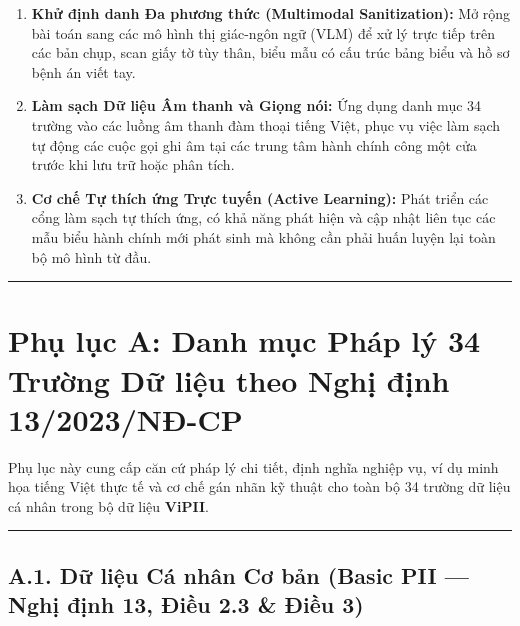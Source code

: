 \documentclass[
  11pt,
  a4paper,
]{article}
\providecommand{\tightlist}{%
  \setlength{\itemsep}{0pt}\setlength{\parskip}{0pt}}
\begin{document}
\begin{enumerate}
\def\labelenumi{\arabic{enumi}.}
\tightlist
\item
  \textbf{Khử định danh Đa phương thức (Multimodal Sanitization):} Mở rộng bài toán sang các mô hình
  thị giác-ngôn ngữ (VLM) để xử lý trực tiếp trên các bản chụp, scan giấy tờ tùy thân, biểu mẫu có
  cấu trúc bảng biểu và hồ sơ bệnh án viết tay.
\item
  \textbf{Làm sạch Dữ liệu Âm thanh và Giọng nói:} Ứng dụng danh mục 34 trường vào các luồng âm
  thanh đàm thoại tiếng Việt, phục vụ việc làm sạch tự động các cuộc gọi ghi âm tại các trung tâm
  hành chính công một cửa trước khi lưu trữ hoặc phân tích.
\item
  \textbf{Cơ chế Tự thích ứng Trực tuyến (Active Learning):} Phát triển các cổng làm sạch tự thích
  ứng, có khả năng phát hiện và cập nhật liên tục các mẫu biểu hành chính mới phát sinh mà không cần
  phải huấn luyện lại toàn bộ mô hình từ đầu.
\end{enumerate}

\begin{center}\rule{0.5\linewidth}{0.5pt}\end{center}

\section{Phụ lục A: Danh mục Pháp lý 34 Trường Dữ liệu theo Nghị định
13/2023/NĐ-CP}\label{phux1ee5-lux1ee5c-a-danh-mux1ee5c-phuxe1p-luxfd-34-trux1b0ux1eddng-dux1eef-liux1ec7u-theo-nghux1ecb-ux111ux1ecbnh-132023nux111-cp}

Phụ lục này cung cấp căn cứ pháp lý chi tiết, định nghĩa nghiệp vụ, ví dụ minh họa tiếng Việt thực
tế và cơ chế gán nhãn kỹ thuật cho toàn bộ 34 trường dữ liệu cá nhân trong bộ dữ liệu
\textbf{ViPII}.

\begin{center}\rule{0.5\linewidth}{0.5pt}\end{center}

\subsection{A.1. Dữ liệu Cá nhân Cơ bản (Basic PII --- Nghị định 13, Điều 2.3 \& Điều
3)}\label{a.1.-dux1eef-liux1ec7u-cuxe1-nhuxe2n-cux1a1-bux1ea3n-basic-pii-nghux1ecb-ux111ux1ecbnh-13-ux111iux1ec1u-2.3-ux111iux1ec1u-3}
\end{document}
